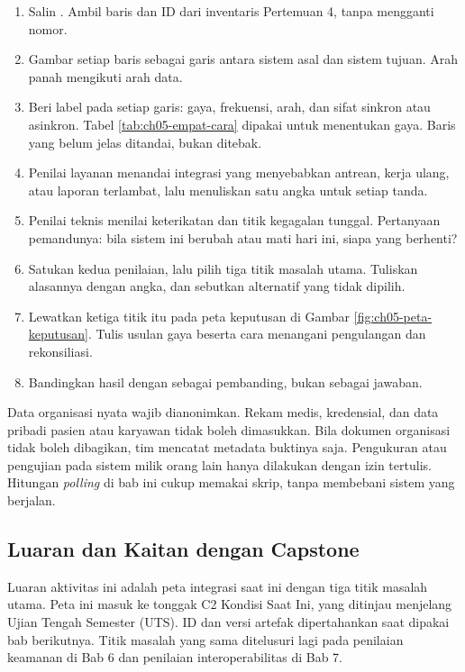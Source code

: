 \begin{enumerate}
  \item Salin . Ambil baris dan ID dari inventaris Pertemuan 4, tanpa mengganti nomor.
  \item Gambar setiap baris sebagai garis antara sistem asal dan sistem tujuan. Arah panah mengikuti arah data.
  \item Beri label pada setiap garis: gaya, frekuensi, arah, dan sifat sinkron atau asinkron. Tabel \ref{tab:ch05-empat-cara} dipakai untuk menentukan
        gaya. Baris yang belum jelas ditandai, bukan ditebak.
  \item Penilai layanan menandai integrasi yang menyebabkan antrean, kerja ulang, atau laporan terlambat, lalu menuliskan satu angka untuk setiap tanda.
  \item Penilai teknis menilai keterikatan dan titik kegagalan tunggal. Pertanyaan pemandunya: bila sistem ini berubah atau mati hari ini, siapa
        yang berhenti?
  \item Satukan kedua penilaian, lalu pilih tiga titik masalah utama. Tuliskan alasannya dengan angka, dan sebutkan alternatif yang tidak dipilih.
  \item Lewatkan ketiga titik itu pada peta keputusan di Gambar \ref{fig:ch05-peta-keputusan}. Tulis usulan gaya beserta cara menangani pengulangan
        dan rekonsiliasi.
  \item Bandingkan hasil dengan  sebagai pembanding, bukan sebagai jawaban.
\end{enumerate}

Data organisasi nyata wajib dianonimkan. Rekam medis, kredensial, dan data pribadi pasien atau karyawan tidak boleh dimasukkan. Bila dokumen organisasi
tidak boleh dibagikan, tim mencatat metadata buktinya saja. Pengukuran atau pengujian pada sistem milik orang lain hanya dilakukan dengan izin tertulis.
Hitungan \textit{polling} di bab ini cukup memakai skrip, tanpa membebani sistem yang berjalan.

\subsection*{Luaran dan Kaitan dengan Capstone}

Luaran aktivitas ini adalah peta integrasi saat ini dengan tiga titik masalah utama. Peta ini masuk ke tonggak C2 Kondisi Saat Ini, yang ditinjau menjelang
Ujian Tengah Semester (UTS). ID dan versi artefak dipertahankan saat dipakai bab berikutnya. Titik masalah yang sama ditelusuri lagi pada penilaian keamanan
di Bab 6 dan penilaian interoperabilitas di Bab 7.

